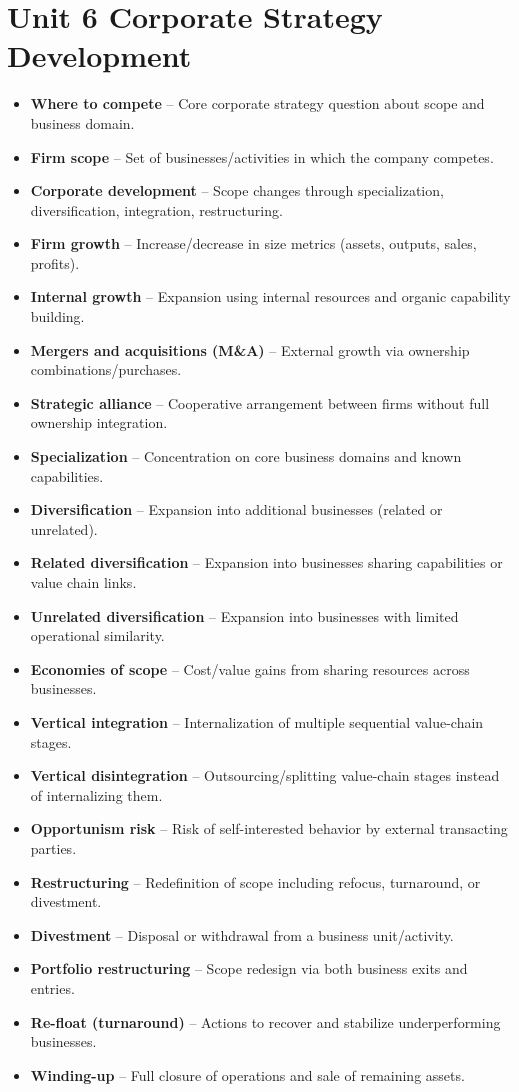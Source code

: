 \documentclass[10pt,a4paper]{article}
\newcommand{\vocab}[2]{\item \textbf{\textcolor{pinkmain}{#1}} -- #2}
\begin{document}
\section*{Unit 6 Corporate Strategy Development}
\begin{itemize}
\vocab{Where to compete}{Core corporate strategy question about scope and business domain.}
\vocab{Firm scope}{Set of businesses/activities in which the company competes.}
\vocab{Corporate development}{Scope changes through specialization, diversification, integration, restructuring.}
\vocab{Firm growth}{Increase/decrease in size metrics (assets, outputs, sales, profits).}
\vocab{Internal growth}{Expansion using internal resources and organic capability building.}
\vocab{Mergers and acquisitions (M\&A)}{External growth via ownership combinations/purchases.}
\vocab{Strategic alliance}{Cooperative arrangement between firms without full ownership integration.}
\vocab{Specialization}{Concentration on core business domains and known capabilities.}
\vocab{Diversification}{Expansion into additional businesses (related or unrelated).}
\vocab{Related diversification}{Expansion into businesses sharing capabilities or value chain links.}
\vocab{Unrelated diversification}{Expansion into businesses with limited operational similarity.}
\vocab{Economies of scope}{Cost/value gains from sharing resources across businesses.}
\vocab{Vertical integration}{Internalization of multiple sequential value-chain stages.}
\vocab{Vertical disintegration}{Outsourcing/splitting value-chain stages instead of internalizing them.}
\vocab{Opportunism risk}{Risk of self-interested behavior by external transacting parties.}
\vocab{Restructuring}{Redefinition of scope including refocus, turnaround, or divestment.}
\vocab{Divestment}{Disposal or withdrawal from a business unit/activity.}
\vocab{Portfolio restructuring}{Scope redesign via both business exits and entries.}
\vocab{Re-float (turnaround)}{Actions to recover and stabilize underperforming businesses.}
\vocab{Winding-up}{Full closure of operations and sale of remaining assets.}
\end{itemize}
\end{document}
